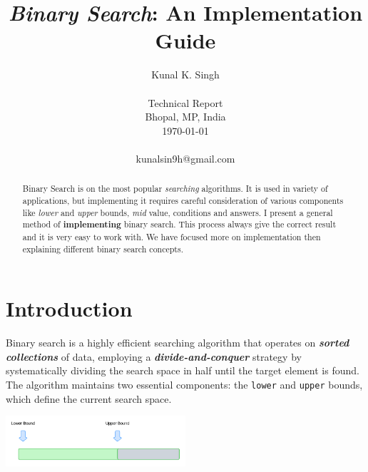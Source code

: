 \documentclass[10pt,twocolumn]{article}
\begin{document}
	
	\title{\emph{Binary Search}: An Implementation Guide}
	
	\author{Kunal K. Singh   \\
		\\
		Technical Report \\
		Bhopal, MP, India \\
		\today
		\\
		\\
		kunalsin9h@gmail.com  \\
	}
	
	\maketitle
	\thispagestyle{empty}
	
	\begin{abstract}
		Binary Search is on the most popular \emph{searching} algorithms. It is used in variety of applications, but implementing it requires careful consideration of various components like \emph{lower} and \emph{upper} bounds, \emph{mid} value, conditions and answers. I present a general method of \textbf{implementing} binary search. This process always give the correct result and it is very easy to work with. We have focused more on implementation then explaining different binary search concepts. 
	\end{abstract}
	
	
	\section{Introduction}
		
		Binary search is a highly efficient searching algorithm that operates on \textit{\textbf{sorted collections}} of data, employing a \textit{\textbf{divide-and-conquer}} strategy by systematically dividing the search space in half until the target element is found. The algorithm maintains two essential components: the \texttt{lower} and \texttt{upper} bounds, which define the current search space. 
		
		\begin{center}
			\includegraphics[width=0.5\textwidth]{bounds.png}
		\end{center}
		
\end{document}
